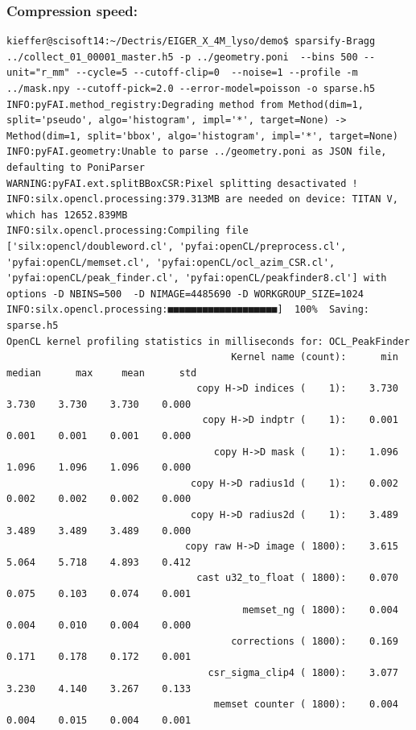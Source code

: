 \documentclass[preprint]{iucr}              %
\begin{document}
\subsubsection{Compression speed:}
\begin{verbatim}
kieffer@scisoft14:~/Dectris/EIGER_X_4M_lyso/demo$ sparsify-Bragg ../collect_01_00001_master.h5 -p ../geometry.poni  --bins 500 --unit="r_mm" --cycle=5 --cutoff-clip=0  --noise=1 --profile -m ../mask.npy --cutoff-pick=2.0 --error-model=poisson -o sparse.h5
INFO:pyFAI.method_registry:Degrading method from Method(dim=1, split='pseudo', algo='histogram', impl='*', target=None) -> Method(dim=1, split='bbox', algo='histogram', impl='*', target=None)
INFO:pyFAI.geometry:Unable to parse ../geometry.poni as JSON file, defaulting to PoniParser
WARNING:pyFAI.ext.splitBBoxCSR:Pixel splitting desactivated !
INFO:silx.opencl.processing:379.313MB are needed on device: TITAN V,  which has 12652.839MB
INFO:silx.opencl.processing:Compiling file ['silx:opencl/doubleword.cl', 'pyfai:openCL/preprocess.cl', 'pyfai:openCL/memset.cl', 'pyfai:openCL/ocl_azim_CSR.cl', 'pyfai:openCL/peak_finder.cl', 'pyfai:openCL/peakfinder8.cl'] with options -D NBINS=500  -D NIMAGE=4485690 -D WORKGROUP_SIZE=1024
INFO:silx.opencl.processing:■■■■■■■■■■■■■■■■■■■]  100%  Saving: sparse.h5                      
OpenCL kernel profiling statistics in milliseconds for: OCL_PeakFinder
                                       Kernel name (count):      min   median      max     mean      std
                                 copy H->D indices (    1):    3.730    3.730    3.730    3.730    0.000
                                  copy H->D indptr (    1):    0.001    0.001    0.001    0.001    0.000
                                    copy H->D mask (    1):    1.096    1.096    1.096    1.096    0.000
                                copy H->D radius1d (    1):    0.002    0.002    0.002    0.002    0.000
                                copy H->D radius2d (    1):    3.489    3.489    3.489    3.489    0.000
                               copy raw H->D image ( 1800):    3.615    5.064    5.718    4.893    0.412
                                 cast u32_to_float ( 1800):    0.070    0.075    0.103    0.074    0.001
                                         memset_ng ( 1800):    0.004    0.004    0.010    0.004    0.000
                                       corrections ( 1800):    0.169    0.171    0.178    0.172    0.001
                                   csr_sigma_clip4 ( 1800):    3.077    3.230    4.140    3.267    0.133
                                    memset counter ( 1800):    0.004    0.004    0.015    0.004    0.001

\end{verbatim}
\end{document}
